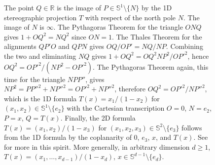 \documentclass[10pt,reqno]{amsart}
\numberwithin{equation}{section}
\numberwithin{figure}{section}
\theoremstyle{plain}
\newcommand{\<}{\langle}
\renewcommand{\>}{\rangle}
\begin{document}
\begin{figure}[p]
  \centering
  \caption{\label{fi:stereo}The point $Q\in\mathbb{R}$ is the image of
    $P\in\mathbb{S}^1\setminus\{N\}$ by the 1D stereographic projection $T$
    with respect of the north pole $N$. The image of $N$ is $\infty$. The
    Pythagoras Theorem for the triangle $ONQ$ gives $1+OQ^2=NQ^2$ since
    $ON=1$. The Thales Theorem for the alignments $QP'O$ and $QPN$ gives
    $OQ/OP'=NQ/NP$. Combining the two and eliminating $NQ$ gives
    $1+OQ^2=OQ^2 NP^2/OP'^2$, hence $OQ^2=OP'^2/(NP^2-OP'^2)$. The Pythagoras
    Theorem again, this time for the triangle $NPP''$, gives
    $NP^2=PP''^2+NP''^2=OP'^2+NP''^2$, therefore $OQ^2=OP'^2/NP''^2$, which is
    the 1D formula $T(x)=x_1/(1-x_2)$ for
    $(x_1,x_2)\in\mathbb{S}^1\setminus\{e_2\}$ with the Cartesian transcription
    $O=0$, $N=e_2$, $P=x$, $Q=T(x)$. Finally, the 2D formula
    $T(x)=(x_1,x_2)/(1-x_3)$ for
    $(x_1,x_2,x_3)\in\mathbb{S}^2\setminus\{e_3\}$ follows from the 1D formula
    by the coplanarity of $0$, $e_3$, $x$, and $T(x)$. See
    \cite{zbMATH07645442} for more in this spirit. More generally, in
    arbitrary dimension $d\geq1$, $T(x)=(x_1,\ldots,x_{d-1})/(1-x_d)$,
    $x\in\mathbb{S}^{d-1}\setminus\{e_d\}$.}
\end{figure}
\end{document}

